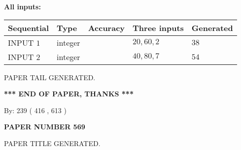 \documentclass[12pt]{article}
\begin{document}
   
   
   
\noindent\vspace{0.1in}\hspace{-0.08in} {\textbf{\Large{All inputs: }}}
   
   
  
  
\noindent\begin{tabular}{|l|l|l|l|l|}
\hline
 Sequential & Type & Accuracy & Three inputs & Generated \\ 
\hline
 
 
  INPUT $  1 $ & integer &  & $
 20
 , 
 60
 , 
 2
 $ & $ 38 $ 
 \\  \hline  
 
 
  INPUT $  2 $ & integer &  & $
 40
 , 
 80
 , 
 7
 $ & $ 54 $ 
 \\  \hline  
 \end{tabular}
   
   
   
   
   
   
 \vspace{0.2in}
 
   
   
\vspace{2.0in} PAPER TAIL GENERATED.
   
   
   
   
\vspace{1.0in} 
{\textbf{\large{ *** END OF PAPER, THANKS *** }}} 
   
   
\hspace{1.0in} By: 
 239 ( 416 ,  613 )
   
   
   
   
\newpage 
\setcounter{page}{ 
   569001 } 
   
   
   
   
 {\textbf{ \Large{ PAPER NUMBER  569  }}}
   
   
\vspace{0.2in}
   
   
   
   
   
   
   
   
 \vspace{0.2in}
 
 
 
 
   
   
 PAPER TITLE GENERATED.
   
   
   
\vspace{0.2in}
   
\end{document}

